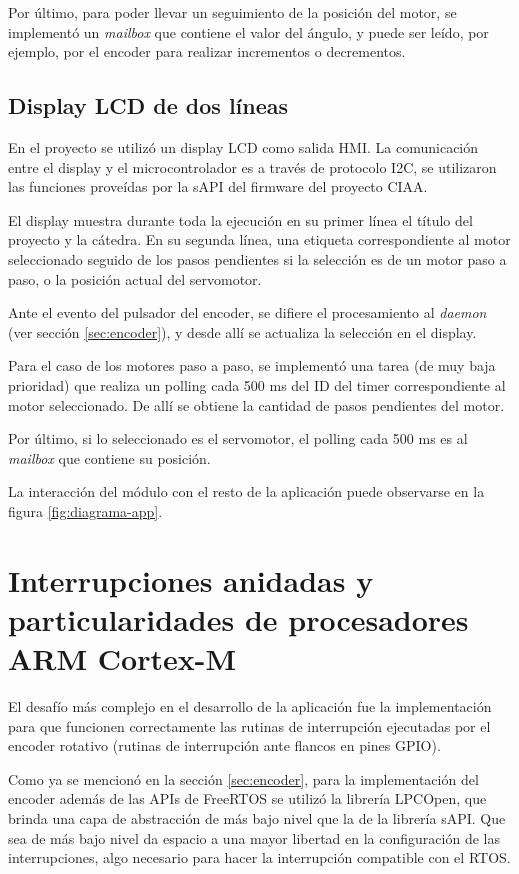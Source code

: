 \documentclass{IEEEtran}
\begin{document}
Por último, para poder llevar un seguimiento de la posición del motor, se implementó un \textit{mailbox} que contiene el valor del ángulo, y puede ser leído, por ejemplo, por el encoder para realizar incrementos o decrementos.

\subsection{Display LCD de dos líneas}
\label{sec:display}

En el proyecto se utilizó un display LCD como salida HMI. La comunicación entre el display y el microcontrolador es a través de protocolo I2C, se utilizaron las funciones proveídas por la sAPI del firmware del proyecto CIAA.

El display muestra durante toda la ejecución en su primer línea el título del proyecto y la cátedra. En su segunda línea, una etiqueta correspondiente al motor seleccionado seguido de los pasos pendientes si la selección es de un motor paso a paso, o la posición actual del servomotor.

Ante el evento del pulsador del encoder, se difiere el procesamiento al \textit{daemon} (ver sección \ref{sec:encoder}), y desde allí se actualiza la selección en el display.

Para el caso de los motores paso a paso, se implementó una tarea (de muy baja prioridad) que realiza un polling cada 500 ms del ID del timer correspondiente al motor seleccionado. De allí se obtiene la cantidad de pasos pendientes del motor.

Por último, si lo seleccionado es el servomotor, el polling cada 500 ms es al \textit{mailbox} que contiene su posición.

La interacción del módulo con el resto de la aplicación puede observarse en la figura \ref{fig:diagrama-app}.

\section{Interrupciones anidadas y particularidades de procesadores ARM Cortex-M}
El desafío más complejo en el desarrollo de la aplicación fue la implementación para que funcionen correctamente las rutinas de interrupción ejecutadas por el encoder rotativo (rutinas de interrupción ante flancos en pines GPIO).

Como ya se mencionó en la sección \ref{sec:encoder}, para la implementación del encoder además de las APIs de FreeRTOS se utilizó la librería LPCOpen, que brinda una capa de abstracción de más bajo nivel que la de la librería sAPI. Que sea de más bajo nivel da espacio a una mayor libertad en la configuración de las interrupciones, algo necesario para hacer la interrupción compatible con el RTOS.
\end{document}
